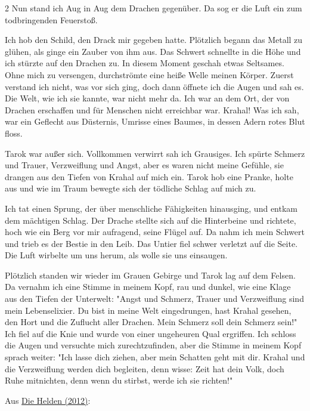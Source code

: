\documentclass[10pt, a4paper, oneside]{book}
\begin{document}
\begin{multicols}{2}
Nun stand ich Aug in Aug dem Drachen gegenüber. Da sog er die Luft ein zum todbringenden Feuerstoß. 

Ich hob den Schild, den Drack mir gegeben hatte. Plötzlich begann das Metall zu glühen, als ginge ein Zauber von ihm aus. Das Schwert schnellte in die Höhe und ich stürzte auf den Drachen zu. In diesem Moment geschah etwas Seltsames. Ohne mich zu versengen, durchströmte eine heiße Welle meinen Körper. Zuerst verstand ich nicht, was vor sich ging, doch dann öffnete ich die Augen und sah es. Die Welt, wie ich sie kannte, war nicht mehr da. Ich war an dem Ort, der von Drachen erschaffen und für Menschen nicht erreichbar war. Krahal! Was ich sah, war ein Geflecht aus Düsternis, Umrisse eines Baumes, in dessen Adern rotes Blut floss.
    
Tarok war außer sich. Vollkommen verwirrt sah ich Grausiges. Ich spürte Schmerz und Trauer, Verzweiflung und Angst, aber es waren nicht meine Gefühle, sie drangen aus den Tiefen von Krahal auf mich ein. Tarok hob eine Pranke, holte aus und wie im Traum bewegte sich der tödliche Schlag auf mich zu. 

Ich tat einen Sprung, der über menschliche Fähigkeiten hinausging, und entkam dem mächtigen Schlag. Der Drache stellte sich auf die Hinterbeine und richtete, hoch wie ein Berg vor mir aufragend, seine Flügel auf. Da nahm ich mein Schwert und trieb es der Bestie in den Leib. Das Untier fiel schwer verletzt auf die Seite. Die Luft wirbelte um uns herum, als wolle sie uns einsaugen. 
    
Plötzlich standen wir wieder im Grauen Gebirge und Tarok lag auf dem Felsen. Da vernahm ich eine Stimme in meinem Kopf, rau und dunkel, wie eine Klage aus den Tiefen der Unterwelt: "Angst und Schmerz, Trauer und Verzweiflung sind mein Lebenselixier. Du bist in meine Welt eingedrungen, hast Krahal gesehen, den Hort und die Zuflucht aller Drachen. Mein Schmerz soll dein Schmerz sein!" Ich fiel auf die Knie und wurde von einer ungeheuren Qual ergriffen. Ich schloss die Augen und versuchte mich zurechtzufinden, aber die Stimme in meinem Kopf sprach weiter: "Ich lasse dich ziehen, aber mein Schatten geht mit dir. Krahal und die Verzweiflung werden dich begleiten, denn wisse: Zeit hat dein Volk, doch Ruhe mitnichten, denn wenn du stirbst, werde ich sie richten!"

\begin{center}
    Aus \hyperref[storytext-2012-die-helden]{Die Helden (2012)}:
\end{center}


\end{multicols}
\end{document}
